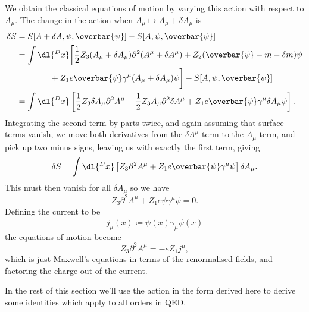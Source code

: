 \documentclass[fleqn]{NotesClass}
\newcommand{\diracadjoint}[1]{\overbar{#1}}
\newcommand{\dalembertian}{\partial^2}
\begin{document}
    We obtain the classical equations of motion by varying this action with respect to \(A_\mu\).
    The change in the action when \(A_\mu \mapsto A_\mu + \delta A_\mu\) is
    \begin{align}
        \delta S &= S[A + \delta A, \psi, \diracadjoint{\psi}] - S[A, \psi, \diracadjoint{\psi}]\\
         &= \int \dl{^D x} \bigg[ \frac{1}{2}Z_3 (A_\mu + \delta A_\mu)\dalembertian(A^\mu + \delta A^\mu) + Z_2(\diracadjoint{\psi} - m - \delta m)\psi \notag\\
         &\qquad\qquad + Z_1e\diracadjoint{\psi}\gamma^\mu(A_\mu + \delta A_\mu)\psi \bigg] - S[A, \psi, \diracadjoint{\psi}]\\
         &= \int \dl{^Dx} \left[ \frac{1}{2}Z_3 \delta A_\mu \dalembertian A^\mu + \frac{1}{2}Z_3 A_\mu \dalembertian \delta A^\mu + Z_1 e\diracadjoint{\psi}\gamma^\mu \delta A_\mu \psi \right].
    \end{align}
    Integrating the second term by parts twice, and again assuming that surface terms vanish, we move both derivatives from the \(\delta A^\mu\) term to the \(A_\mu\) term, and pick up two minus signs, leaving us with exactly the first term, giving
    \begin{equation}\label{eqn:change in action with A varying}
        \delta S = \int \dl{^Dx}\left[ Z_3 \dalembertian A^\mu + Z_1e\diracadjoint{\psi}\gamma^\mu \psi \right] \delta A_\mu.
    \end{equation}
    This must then vanish for all \(\delta A_\mu\) so we have
    \begin{equation}
        Z_3 \dalembertian A^\mu + Z_1 e\diracadjoint{\psi} \gamma^\mu \psi = 0.
    \end{equation}
    Defining the current to be
    \begin{equation}
        j_\mu(x) \coloneqq \diracadjoint{\psi}(x) \gamma_\mu \psi(x)
    \end{equation}
    the equations of motion become
    \begin{equation}
        Z_3 \dalembertian A^\mu = -eZ_1 j^\mu,
    \end{equation}
    which is just Maxwell's equations in terms of the renormalised fields, and factoring the charge out of the current.
    
    In the rest of this section we'll use the action in the form derived here to derive some identities which apply to all orders in QED.
    
\end{document}
